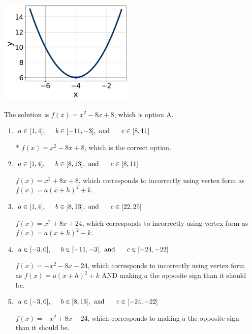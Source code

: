 \documentclass{extbook}[14pt]
\begin{document}
\begin{enumerate}
{\begin{center}
    \includegraphics[width=0.5\textwidth]{../Figures/quadraticGraphToEquationC.png}
\end{center}


The solution is \( f(x) = x^{2} -8 x + 8 \), which is option A.\begin{enumerate}[label=\Alph*.]
\item \( a \in [1, 4], \hspace*{5mm} b \in [-11, -3], \text{ and } \hspace*{5mm} c \in [8, 11] \)

* $f(x)=x^{2} -8 x + 8$, which is the correct option.
\item \( a \in [1, 4], \hspace*{5mm} b \in [8, 13], \text{ and } \hspace*{5mm} c \in [8, 11] \)

$f(x)=x^{2} +8 x + 8$, which corresponds to incorrectly using vertex form as $f(x) = a(x+h)^2+k$.
\item \( a \in [1, 4], \hspace*{5mm} b \in [8, 13], \text{ and } \hspace*{5mm} c \in [22, 25] \)

$f(x)=x^{2} +8 x + 24$, which corresponds to incorrectly using vertex form as $f(x) = a(x+h)^2 - k$.
\item \( a \in [-3, 0], \hspace*{5mm} b \in [-11, -3], \text{ and } \hspace*{5mm} c \in [-24, -22] \)

$f(x)=-x^{2} -8 x -24$, which corresponds to incorrectly using vertex form as $f(x) = a(x+h)^2+k$ AND making $a$ the opposite sign than it should be.
\item \( a \in [-3, 0], \hspace*{5mm} b \in [8, 13], \text{ and } \hspace*{5mm} c \in [-24, -22] \)

$f(x)=-x^{2} +8 x -24$, which corresponds to making $a$ the opposite sign than it should be.
\end{enumerate}

}
\end{enumerate}
\end{document}

